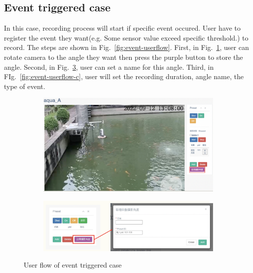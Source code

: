 \subsection{Event triggered case}
In this case, recording process will start if specific event occured. User have to register the event they want(e.g. Some sensor value exceed specific threshold.) to record. The steps are shown in Fig.~\ref{fig:event-userflow}. First, in Fig.~\ref{fig:event-userflow-a}, user can rotate camera to the angle they want then press the purple button to store the angle. Second, in Fig.~\ref{fig:event-userflow-b}, user can set a name for this angle. Third, in FIg.~\ref{fig:event-userflow-c}, user will set the recording duration, angle name, the type of event.

\begin{figure}[H]
    \centering
    \begin{subfigure}{\textwidth}
        \includegraphics[width=\textwidth]{figsrc/event-userflow-a.png}
        \label{fig:event-userflow-a}
    \end{subfigure}

\medskip
    \begin{subfigure}{\textwidth}
        \includegraphics[width=\textwidth]{figsrc/event-userflow-b.png}
        \label{fig:event-userflow-b}
    \end{subfigure}
    \caption{User flow of event triggered case}
\end{figure}

